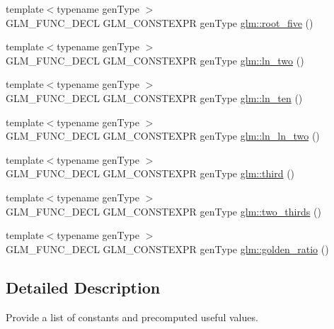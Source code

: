 \begin{DoxyCompactItemize}
\item 
{\footnotesize template$<$typename gen\+Type $>$ }\\G\+L\+M\+\_\+\+F\+U\+N\+C\+\_\+\+D\+E\+CL G\+L\+M\+\_\+\+C\+O\+N\+S\+T\+E\+X\+PR gen\+Type \hyperlink{group__gtc__constants_gae9ebbded75b53d4faeb1e4ef8b3347a2}{glm\+::root\+\_\+five} ()
\item 
{\footnotesize template$<$typename gen\+Type $>$ }\\G\+L\+M\+\_\+\+F\+U\+N\+C\+\_\+\+D\+E\+CL G\+L\+M\+\_\+\+C\+O\+N\+S\+T\+E\+X\+PR gen\+Type \hyperlink{group__gtc__constants_ga24f4d27765678116f41a2f336ab7975c}{glm\+::ln\+\_\+two} ()
\item 
{\footnotesize template$<$typename gen\+Type $>$ }\\G\+L\+M\+\_\+\+F\+U\+N\+C\+\_\+\+D\+E\+CL G\+L\+M\+\_\+\+C\+O\+N\+S\+T\+E\+X\+PR gen\+Type \hyperlink{group__gtc__constants_gaf97ebc6c059ffd788e6c4946f71ef66c}{glm\+::ln\+\_\+ten} ()
\item 
{\footnotesize template$<$typename gen\+Type $>$ }\\G\+L\+M\+\_\+\+F\+U\+N\+C\+\_\+\+D\+E\+CL G\+L\+M\+\_\+\+C\+O\+N\+S\+T\+E\+X\+PR gen\+Type \hyperlink{group__gtc__constants_gaca94292c839ed31a405ab7a81ae7e850}{glm\+::ln\+\_\+ln\+\_\+two} ()
\item 
{\footnotesize template$<$typename gen\+Type $>$ }\\G\+L\+M\+\_\+\+F\+U\+N\+C\+\_\+\+D\+E\+CL G\+L\+M\+\_\+\+C\+O\+N\+S\+T\+E\+X\+PR gen\+Type \hyperlink{group__gtc__constants_ga3077c6311010a214b69ddc8214ec13b5}{glm\+::third} ()
\item 
{\footnotesize template$<$typename gen\+Type $>$ }\\G\+L\+M\+\_\+\+F\+U\+N\+C\+\_\+\+D\+E\+CL G\+L\+M\+\_\+\+C\+O\+N\+S\+T\+E\+X\+PR gen\+Type \hyperlink{group__gtc__constants_ga9b4d2f4322edcf63a6737b92a29dd1f5}{glm\+::two\+\_\+thirds} ()
\item 
{\footnotesize template$<$typename gen\+Type $>$ }\\G\+L\+M\+\_\+\+F\+U\+N\+C\+\_\+\+D\+E\+CL G\+L\+M\+\_\+\+C\+O\+N\+S\+T\+E\+X\+PR gen\+Type \hyperlink{group__gtc__constants_ga748cf8642830657c5b7eae04d0a80899}{glm\+::golden\+\_\+ratio} ()
\end{DoxyCompactItemize}


\subsection{Detailed Description}
Provide a list of constants and precomputed useful values. 

